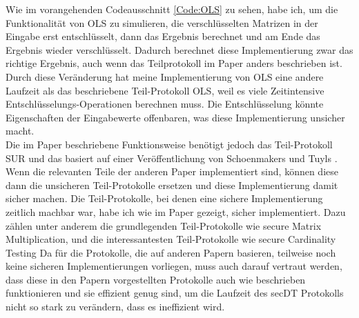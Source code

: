 Wie im vorangehenden Codeausschnitt \ref{Code:OLS} zu sehen, habe ich, um die Funktionalität von OLS zu simulieren, die verschlüsselten Matrizen in der Eingabe erst entschlüsselt, dann das Ergebnis berechnet und am Ende das Ergebnis wieder verschlüsselt. Dadurch berechnet diese Implementierung zwar das richtige Ergebnis, auch wenn das Teilprotokoll im Paper \cite{Doettling2021} anders beschrieben ist. Durch diese Veränderung hat meine Implementierung von OLS eine andere Laufzeit als das beschriebene Teil-Protokoll OLS, weil es viele Zeitintensive Entschlüsselungs-Operationen berechnen muss. Die Entschlüsselung könnte Eigenschaften der Eingabewerte offenbaren, was diese Implementierung unsicher macht.\\
Die im Paper beschriebene Funktionsweise benötigt jedoch das Teil-Protokoll SUR und das basiert auf einer Veröffentlichung von Schoenmakers und Tuyls \cite{Schoenmakers}.
Wenn die relevanten Teile der anderen Paper implementiert sind, können diese dann die unsicheren Teil-Protokolle ersetzen und diese Implementierung damit sicher machen.
Die Teil-Protokolle, bei denen eine sichere Implementierung zeitlich machbar war, habe ich wie im Paper gezeigt, sicher implementiert. Dazu zählen unter anderem die grundlegenden Teil-Protokolle wie \glqq secure Matrix Multiplication\grqq{}, und die interessantesten Teil-Protokolle wie \glqq secure Cardinality Testing\grqq
Da für die Protokolle, die auf anderen Papern basieren, teilweise noch keine sicheren Implementierungen vorliegen, muss auch darauf vertraut werden, dass diese in den Papern vorgestellten Protokolle auch wie beschrieben funktionieren und sie effizient genug sind, um die Laufzeit des secDT Protokolls nicht so stark zu verändern, dass es ineffizient wird.\\


